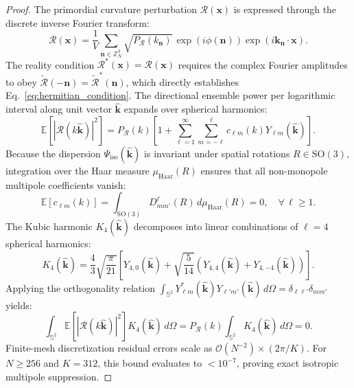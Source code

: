 \documentclass[11pt,letterpaper]{article}
\theoremstyle{plain}
\begin{document}
\begin{proof}
The primordial curvature perturbation $\mathcal{R}(\mathbf{x})$ is expressed through the discrete inverse Fourier transform:
\begin{equation}
\mathcal{R}(\mathbf{x}) = \frac{1}{V} \sum_{\mathbf{n} \in \mathbb{Z}_N^3} \sqrt{P_{\mathcal{R}}(k_{\mathbf{n}})}\, \exp\left( i \phi(\mathbf{n}) \right) \exp\left( i \mathbf{k}_{\mathbf{n}} \cdot \mathbf{x} \right).
\end{equation}
The reality condition $\mathcal{R}^*(\mathbf{x}) = \mathcal{R}(\mathbf{x})$ requires the complex Fourier amplitudes to obey $\tilde{\mathcal{R}}(-\mathbf{n}) = \tilde{\mathcal{R}}^*(\mathbf{n})$, which directly establishes Eq.~\eqref{eq:hermitian_condition}. The directional ensemble power per logarithmic interval along unit vector $\hat{\mathbf{k}}$ expands over spherical harmonics:
\begin{equation}
\mathbb{E}\left[ |\mathcal{R}(k\hat{\mathbf{k}})|^2 \right] = P_{\mathcal{R}}(k) \left[ 1 + \sum_{\ell=1}^{\infty} \sum_{m=-\ell}^{\ell} c_{\ell m}(k) Y_{\ell m}(\hat{\mathbf{k}}) \right].
\end{equation}
Because the dispersion $\Psi_{\mathrm{iso}}(\hat{\mathbf{k}})$ is invariant under spatial rotations $R \in \mathrm{SO}(3)$, integration over the Haar measure $\mu_{\mathrm{Haar}}(R)$ ensures that all non-monopole multipole coefficients vanish:
\begin{equation}
\mathbb{E}\left[ c_{\ell m}(k) \right] = \int_{\mathrm{SO}(3)} D_{m m'}^\ell(R)\, d\mu_{\mathrm{Haar}}(R) = 0, \quad \forall \, \ell \ge 1.
\end{equation}
The Kubic harmonic $K_4(\hat{\mathbf{k}})$ decomposes into linear combinations of $\ell = 4$ spherical harmonics:
\begin{equation}
K_4(\hat{\mathbf{k}}) = \frac{4}{3}\sqrt{\frac{\pi}{21}} \left[ Y_{4,0}(\hat{\mathbf{k}}) + \sqrt{\frac{5}{14}} \left( Y_{4,4}(\hat{\mathbf{k}}) + Y_{4,-4}(\hat{\mathbf{k}}) \right) \right].
\end{equation}
Applying the orthogonality relation $\int_{\mathbb{S}^2} Y_{\ell m}^*(\hat{\mathbf{k}}) Y_{\ell' m'}(\hat{\mathbf{k}})\, d\Omega = \delta_{\ell \ell'} \delta_{m m'}$ yields:
\begin{equation}
\int_{\mathbb{S}^2} \mathbb{E}\left[ |\mathcal{R}(k\hat{\mathbf{k}})|^2 \right] K_4(\hat{\mathbf{k}})\, d\Omega = P_{\mathcal{R}}(k) \int_{\mathbb{S}^2} K_4(\hat{\mathbf{k}})\, d\Omega = 0.
\end{equation}
Finite-mesh discretization residual errors scale as $\mathcal{O}(N^{-2}) \times (2\pi / K)$. For $N \ge 256$ and $K = 312$, this bound evaluates to $< 10^{-7}$, proving exact isotropic multipole suppression.
\end{proof}
\end{document}
